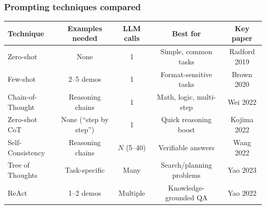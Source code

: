 \documentclass[aspectratio=169]{beamer}
\begin{document}
\begin{frame}
\begin{center}
\end{center}
\end{frame}

\begin{frame}
\frametitle{Prompting techniques compared}

\vspace{-0.1cm}
\renewcommand{\arraystretch}{1.3}
\begin{center}
{\scriptsize
\begin{tabular}{l c c c c}
  \textbf{Technique} & \textbf{Examples needed} & \textbf{LLM calls} & \textbf{Best for} & \textbf{Key paper} \\
  \hline
  Zero-shot & None & 1 & Simple, common tasks & Radford 2019 \\[1pt]
  Few-shot & 2--5 demos & 1 & Format-sensitive tasks & Brown 2020 \\[1pt]
  Chain-of-Thought & Reasoning chains & 1 & Math, logic, multi-step & Wei 2022 \\[1pt]
  Zero-shot CoT & None (``step by step'') & 1 & Quick reasoning boost & Kojima 2022 \\[1pt]
  Self-Consistency & Reasoning chains & $N$ (5--40) & Verifiable answers & Wang 2022 \\[1pt]
  Tree of Thoughts & Task-specific & Many & Search/planning problems & Yao 2023 \\[1pt]
  ReAct & 1--2 demos & Multiple & Knowledge-grounded QA & Yao 2022 \\
  \hline
\end{tabular}
}
\end{center}

\vspace{-0.45cm}
\begin{center}
\end{center}
\end{frame}
\end{document}
